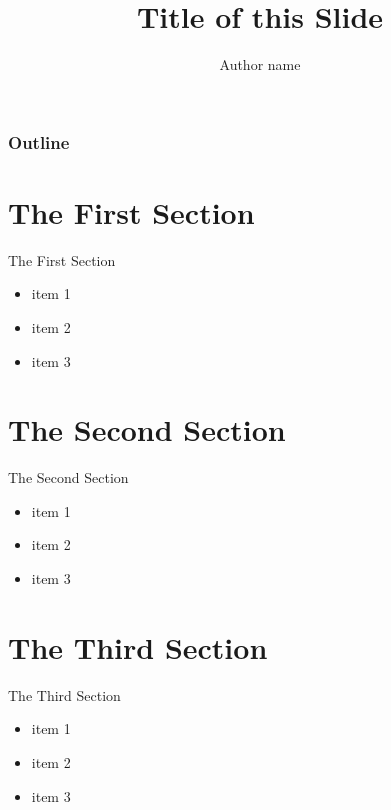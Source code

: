 \documentclass[pdf]{beamer}
\title{Title of this Slide}
\author{Author name}
\begin{document}
	\begin{frame}
	    \titlepage
	\end{frame}

	\begin{frame}
	    \frametitle{Outline}
	    \tableofcontents
	\end{frame}


	\section{The First Section}
	\begin{frame}{The First Section}
		\begin{itemize}
		\item item 1
		\item item 2
		\item item 3
		\end{itemize}
	\end{frame}

	\section{The Second Section}
	\begin{frame}{The Second Section}
		\begin{itemize}
		\item item 1
		\item item 2
		\item item 3
		\end{itemize}
	\end{frame}

	\section{The Third Section}
	\begin{frame}{The Third Section}
		\begin{itemize}
		\item item 1
		\item item 2
		\item item 3
		\end{itemize}
	\end{frame}
\end{document}
